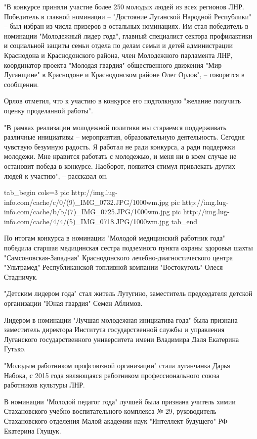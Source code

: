 "В конкурсе приняли участие более 250 молодых людей из всех регионов ЛНР.
Победитель в главной номинации – "Достояние Луганской Народной Республики" –
был избран из числа призеров в остальных номинациях. Им стал победитель в
номинации "Молодежный лидер года", главный специалист сектора профилактики и
социальной защиты семьи отдела по делам семьи и детей администрации Краснодона
и Краснодонского района, член Молодежного парламента ЛНР, координатор проекта
"Молодая гвардия" общественного движения "Мир Луганщине" в Краснодоне и
Краснодонском районе Олег Орлов", – говорится в сообщении.

Орлов отметил, что к участию в конкурсе его подтолкнуло "желание получить
оценку проделанной работы".

"В рамках реализации молодежной политики мы стараемся поддерживать различные
инициативы – мероприятия, образовательную деятельность. Сегодня чувствую
безумную радость. Я работал не ради конкурса, а ради поддержки молодежи. Мне
нравится работать с молодежью, и меня ни в коем случае не остановит победа в
конкурсе. Наоборот, появится стимул привлекать других людей к участию", –
рассказал он.  

\ifcmt
tab_begin cols=3
	pic http://img.lug-info.com/cache/c/0/(9)_IMG_0732.JPG/1000wm.jpg
	pic http://img.lug-info.com/cache/b/b/(7)_IMG_0725.JPG/1000wm.jpg
	pic http://img.lug-info.com/cache/4/4/(5)_IMG_0718.JPG/1000wm.jpg
tab_end
\fi

По итогам конкурса в номинации "Молодой медицинский работник года" победила
старшая медицинская сестра подземного пункта охраны здоровья шахты
"Самсоновская-Западная" Краснодонского лечебно-диагностического центра
"Ультрамед" Республиканской топливной компании "Востокуголь" Олеся Стадничук.

"Детским лидером года" стал житель Лутугино, заместитель председателя детской
организации "Юная гвардия" Семен Аблимов.

Лидером в номинации "Лучшая молодежная инициатива года" была признана
заместитель директора Института государственной службы и управления Луганского
государственного университета имени Владимира Даля Екатерина Гутько.

"Молодым работником профсоюзной организации" стала луганчанка Дарья Набока, с
2015 года являющаяся работником профессионального союза работников культуры
ЛНР.

В номинации "Молодой педагог года" лучшей была признана учитель химии
Стахановского учебно-воспитательного комплекса № 29, руководитель Стахановского
отделения Малой академии наук "Интеллект будущего" РФ Екатерина Глущук.

